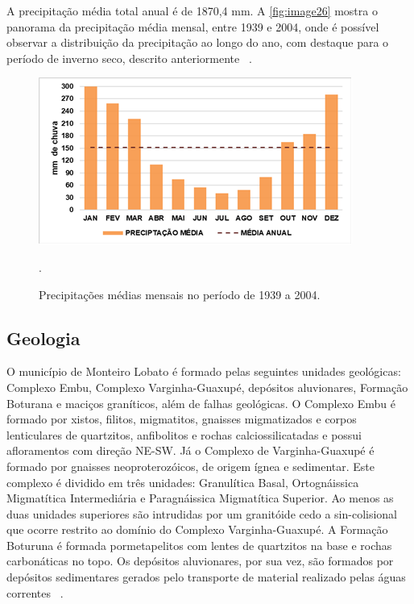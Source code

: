 A precipitação média total anual é de 1870,4 mm. A \autoref{fig:image26} mostra o panorama da precipitação média mensal, entre 1939 e 2004, onde é possível observar a distribuição da precipitação ao longo do ano, com destaque para o período de inverno seco, descrito anteriormente ~\cite{MonteiroLobato2014}.

 \begin{figure}[h!]
	\centering
	\includegraphics[width=1\linewidth]{produtos/proddois/image26}
	\caption{Precipitações médias mensais no período de 1939 a 2004.}
	.
	\label{fig:image26}
\end{figure}

\subsection{Geologia}

O município de Monteiro Lobato é formado pelas seguintes unidades geológicas: Complexo Embu, Complexo Varginha-Guaxupé, depósitos aluvionares, Formação Boturana e maciços graníticos, além de falhas geológicas. O Complexo Embu é formado por xistos, filitos, migmatitos, gnaisses migmatizados e corpos lenticulares de quartzitos, anfibolitos e rochas calciossilicatadas e possui afloramentos com direção NE-SW. Já o Complexo de Varginha-Guaxupé é formado por gnaisses neoproterozóicos, de origem ígnea e sedimentar. Este complexo é dividido em três unidades: Granulítica Basal, Ortognáissica Migmatítica Intermediária e Paragnáissica Migmatítica Superior.  Ao menos as duas unidades superiores são intrudidas por um granitóide cedo a sin-colisional que ocorre restrito ao domínio do Complexo Varginha-Guaxupé. A Formação Boturuna é formada pormetapelitos com lentes de quartzitos na base e rochas carbonáticas no topo. Os depósitos aluvionares, por sua vez, são formados por depósitos sedimentares gerados pelo transporte de material realizado pelas águas correntes ~\cite{CPRM}.

